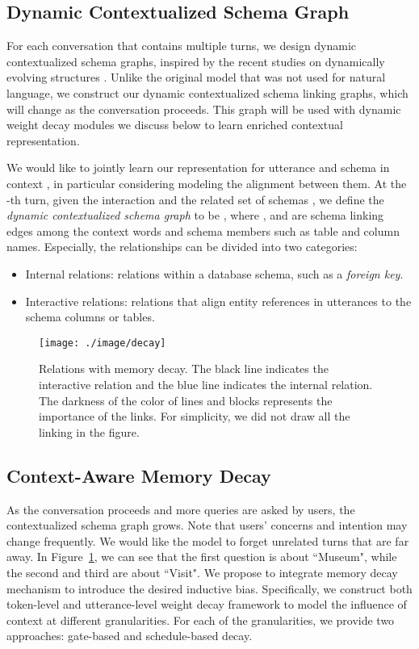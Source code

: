 \documentclass[letterpaper]{article} \usepackage{aaai21}  \usepackage{times}  \usepackage{helvet} \usepackage{courier}  \usepackage[hyphens]{url}  \usepackage{graphicx} \urlstyle{rm} \def\UrlFont{\rm}  \usepackage{natbib}  \usepackage{caption} \frenchspacing  \setlength{\pdfpagewidth}{8.5in}  \setlength{\pdfpageheight}{11in}
\begin{document}
\subsection{Dynamic Contextualized Schema Graph}
\label{dynamic graph}

For each conversation that contains multiple turns, we design dynamic contextualized schema graphs, inspired by the recent studies on dynamically evolving structures \cite{pareja2020evolvegcn}. Unlike the original model that was not used for natural language, we construct our dynamic contextualized schema linking graphs, which will change as the conversation proceeds. This graph will be used with dynamic weight decay modules we discuss below to learn enriched contextual representation. 

We would like to jointly learn our representation for utterance  and schema  in context , in particular considering modeling the alignment between them. At the -th turn, given the interaction  and the related set of schemas , we define the \textit{dynamic contextualized schema graph} to be , where , and  are schema linking edges among the context words and schema members such as table and column names.
Especially, the relationships can be divided into two categories: 
\begin{itemize}
    \item Internal relations: relations within a database schema, such as a \textit{foreign key}. 
    \item Interactive relations:  relations that align entity references in utterances to the schema columns or tables.
\end{itemize}

\begin{figure}
	\centering
	\texttt{[image: ./image/decay]}
	\caption{Relations with memory decay. 
	The black line indicates the interactive relation and the blue line indicates the internal relation. The darkness of the color of lines and blocks represents the importance of the links. 
	For simplicity, we did not draw all the linking in the figure.}
	\label{decay}
\end{figure}

\subsection{Context-Aware Memory Decay}
\label{context}
As the conversation proceeds and more queries are asked by users, the contextualized schema graph grows. Note that users' concerns and intention may change frequently. We would like the model to forget unrelated turns that are far away.
In Figure~\ref{decay}, we can see that the first question is about ``Museum", while the second and third are about ``Visit".
We propose to integrate memory decay mechanism to introduce the desired inductive bias. Specifically, we construct both token-level and utterance-level weight decay framework to model the influence of context at different granularities.
For each of the granularities, we provide two approaches: gate-based and schedule-based decay.
\end{document}
